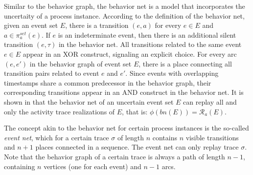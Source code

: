 Similar to the behavior graph, the behavior net is a model that incorporates the uncertaity of a process instance.
According to the definition of the behavior net, given an event set $E$, there is a transition $(e,a)$ for every $e \in E$ and $a \in \pi_a^{set}(e)$.
If $e$ is an indeterminate event, then there is an additional silent transition $(e,\tau)$ in the behavior net.
All transitions related to the same event $e \in E$ appear in an XOR construct, signaling an explicit choice.
For every arc $(e,e')$ in the behavior graph of event set $E$, there is a place connecting all transition pairs related to event $e$ and $e'$.
Since events with overlapping timestamps share a common predecessor in the behavior graph, their corresponding transitions appear in an AND construct in the behavior net.
It is shown in \cite{conformance} that the behavior net of an uncertain event set $E$ can replay all and only the activity trace realizations of $E$, that is: $\phi(bn(E)) = \mathcal{R}_a(E)$. 

The concept akin to the behavior net for certain process instances is the so-called \textit{event net}, which for a certain trace $\sigma$ of length $n$ contains $n$ visible transitions and $n+1$ places connected in a sequence.
The event net can only replay trace $\sigma$.
Note that the behavior graph of a certain trace is always a path of length $n-1$, containing $n$ vertices (one for each event) and $n-1$ arcs.

